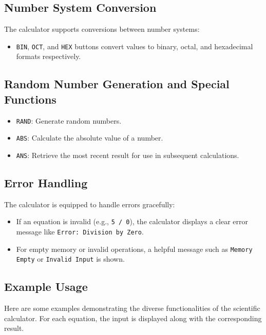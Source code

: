 \documentclass[a4paper,12pt]{article}
\begin{document}
\subsection{Number System Conversion}

The calculator supports conversions between number systems:

\begin{itemize}
    \item \texttt{BIN}, \texttt{OCT}, and \texttt{HEX} buttons convert values to binary, octal, and hexadecimal formats respectively.
\end{itemize}

\subsection*{Random Number Generation and Special Functions}

\begin{itemize}
    \item \texttt{RAND}: Generate random numbers.
    \item \texttt{ABS}: Calculate the absolute value of a number.
    \item \texttt{ANS}: Retrieve the most recent result for use in subsequent calculations.
\end{itemize}

\subsection{Error Handling}

The calculator is equipped to handle errors gracefully:

\begin{itemize}
    \item If an equation is invalid (e.g., \texttt{5 / 0}), the calculator displays a clear error message like \texttt{Error: Division by Zero}.
    \item For empty memory or invalid operations, a helpful message such as \texttt{Memory Empty} or \texttt{Invalid Input} is shown.
\end{itemize}

\subsection{Example Usage}

Here are some examples demonstrating the diverse functionalities of the scientific calculator. For each equation, the input is displayed along with the corresponding result.
\end{document}
